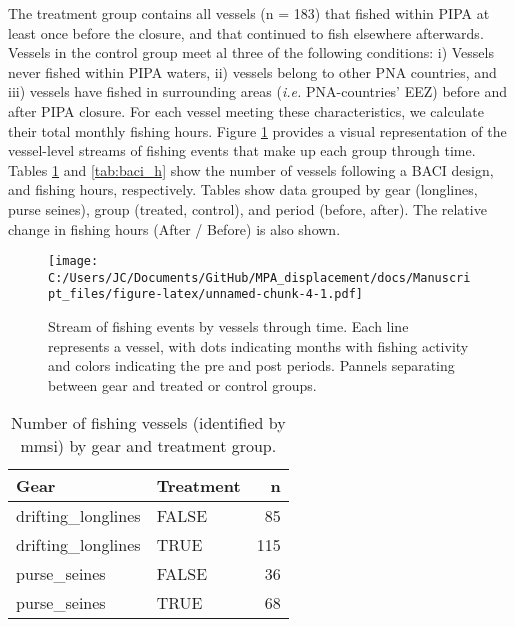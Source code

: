 \documentclass[12pt,]{article}
\begin{document}
The treatment group contains all vessels (n = 183) that fished within
PIPA at least once before the closure, and that continued to fish
elsewhere afterwards. Vessels in the control group meet al three of the
following conditions: i) Vessels never fished within PIPA waters, ii)
vessels belong to other PNA countries, and iii) vessels have fished in
surrounding areas (\emph{i.e.} PNA-countries' EEZ) before and after PIPA
closure. For each vessel meeting these characteristics, we calculate
their total monthly fishing hours. Figure \ref{fig:baci_strict} provides
a visual representation of the vessel-level streams of fishing events
that make up each group through time. Tables \ref{tab:baci_n_s} and
\ref{tab:baci_h} show the number of vessels following a BACI design, and
fishing hours, respectively. Tables show data grouped by gear
(longlines, purse seines), group (treated, control), and period (before,
after). The relative change in fishing hours (After / Before) is also
shown.

\begin{figure}
\centering
\texttt{[image: C:/Users/JC/Documents/GitHub/MPA\_displacement/docs/Manuscript\_files/figure-latex/unnamed-chunk-4-1.pdf]}
\caption{\label{fig:unnamed-chunk-4}\label{fig:baci_strict}Stream of fishing
events by vessels through time. Each line represents a vessel, with dots
indicating months with fishing activity and colors indicating the pre
and post periods. Pannels separating between gear and treated or control
groups.}
\end{figure}

\begin{table}[H]

\caption{\label{tab:unnamed-chunk-5}\label{tab:baci_n_s}Number of fishing vessels (identified by mmsi) by gear and treatment group.}
\centering
\begin{tabular}[t]{llr}
\toprule
Gear & Treatment & n\\
\midrule
drifting\_longlines & FALSE & 85\\
drifting\_longlines & TRUE & 115\\
purse\_seines & FALSE & 36\\
purse\_seines & TRUE & 68\\
\bottomrule
\end{tabular}
\end{table}
\end{document}
